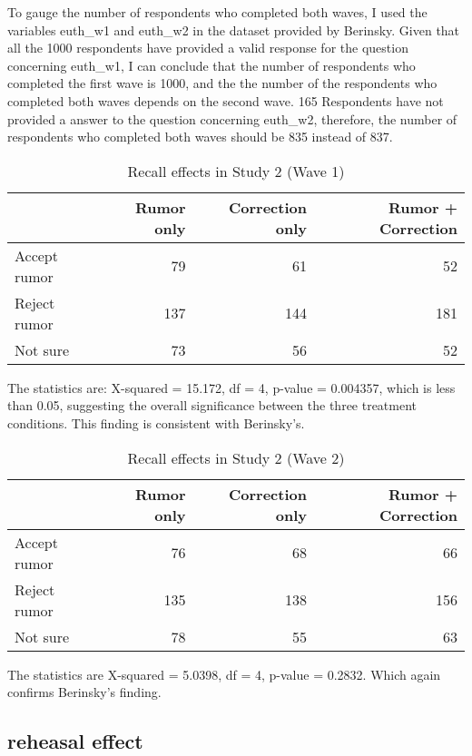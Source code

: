 \documentclass[AER]{AEA}
\begin{document}
To gauge the number of respondents who completed both waves, I used the
variables euth\_w1 and euth\_w2 in the dataset provided by Berinsky.
Given that all the 1000 respondents have provided a valid response for
the question concerning euth\_w1, I can conclude that the number of
respondents who completed the first wave is 1000, and the the number of
the respondents who completed both waves depends on the second wave. 165
Respondents have not provided a answer to the question concerning
euth\_w2, therefore, the number of respondents who completed both waves
should be 835 instead of 837.

\begin{table}[!h]

\caption{\label{tab:unnamed-chunk-15}Recall effects in Study 2 (Wave 1)}
\centering
\begin{tabular}[t]{lrrr}
\toprule
  & Rumor only & Correction only & Rumor + Correction\\
\midrule
Accept rumor & 79 & 61 & 52\\
Reject rumor & 137 & 144 & 181\\
Not sure & 73 & 56 & 52\\
\bottomrule
\end{tabular}
\end{table}

The statistics are: X-squared = 15.172, df = 4, p-value = 0.004357,
which is less than 0.05, suggesting the overall significance between the
three treatment conditions. This finding is consistent with Berinsky's.

\begin{table}[!h]

\caption{\label{tab:unnamed-chunk-16}Recall effects in Study 2 (Wave 2)}
\centering
\begin{tabular}[t]{lrrr}
\toprule
  & Rumor only & Correction only & Rumor + Correction\\
\midrule
Accept rumor & 76 & 68 & 66\\
Reject rumor & 135 & 138 & 156\\
Not sure & 78 & 55 & 63\\
\bottomrule
\end{tabular}
\end{table}

The statistics are X-squared = 5.0398, df = 4, p-value = 0.2832. Which
again confirms Berinsky's finding.

\hypertarget{reheasal-effect}{%
\subsection{reheasal effect}\label{reheasal-effect}}
\end{document}
